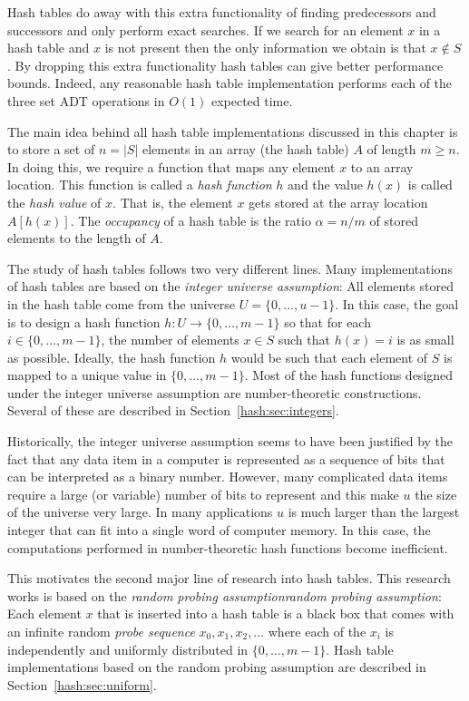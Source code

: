 Hash tables do away with this extra functionality of finding
predecessors and successors and only perform exact searches. If we
search for an element $x$ in a hash table and $x$ is not present then
the only information we obtain is that $x\notin S$. By dropping this
extra functionality hash tables can give better performance bounds.
Indeed, any reasonable hash table implementation performs each of the
three set ADT operations in $O(1)$ expected time.

The main idea behind all hash table implementations discussed in this
chapter is to store a set of $n=|S|$ elements in an array (the hash
table) $A$ of length $m\ge n$.  In doing this, we require a function
that maps any element $x$ to an array location.  This function is
called a \emph{hash function} $h$ and the value
$h(x)$ is called the \emph{hash value} of $x$.  That is, the element
$x$ gets stored at the array location $A[h(x)]$.  The \emph{occupancy}
of a hash table is the ratio $\alpha=n/m$ of stored elements to the
length of $A$.  

The study of hash tables follows two very different lines. Many
implementations of hash tables are based on the \emph{integer universe
assumption}: All elements stored in
the hash table come from the universe $U=\{0,\ldots,u-1\}$.  In this
case, the goal is to design a hash function $h:U\rightarrow
\{0,\ldots,m-1\}$ so that for each $i\in \{0,\ldots,m-1\}$, the number
of elements $x\in S$ such that $h(x)=i$ is as small as possible.
Ideally, the hash function $h$ would be such that each element of $S$
is mapped to a unique value in $\{0,\ldots,m-1\}$.  Most of the hash
functions designed under the integer universe assumption are
number-theoretic constructions. Several of these are described in
Section~\ref{hash:sec:integers}.

Historically, the integer universe assumption seems to have been
justified by the fact that any data item in a computer is represented
as a sequence of bits that can be interpreted as a binary number.
However, many complicated data items require a large (or variable)
number of bits to represent and this make $u$ the size of the universe
very large.  In many applications $u$ is much larger than the largest
integer that can fit into a single word of computer memory.  In this
case, the computations performed in number-theoretic hash functions
become inefficient.

This motivates the second major line of research into hash tables.
This research works is based on the \emph{random probing
assumption\emph{random probing assumption}}: Each element $x$ that is
inserted into a hash table is a black box that comes with an infinite
random \emph{probe sequence}
$x_0,x_1,x_2,\ldots$ where each of the $x_i$ is independently and
uniformly distributed in $\{0,\ldots,m-1\}$.  Hash table
implementations based on the random probing assumption are described
in Section~\ref{hash:sec:uniform}.


